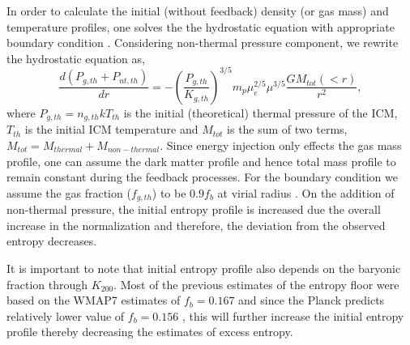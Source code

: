\documentclass[a4paper,fleqn,usenatbib]{mnras}
\begin{document}
In order to calculate the initial (without feedback) density (or gas mass) and temperature profiles, one solves the the hydrostatic equation with appropriate boundary condition \citep{Chaudhuri2012,Chaudhuri2013}. 
Considering non-thermal pressure component, we rewrite the hydrostatic equation as,
\begin{equation}
\frac{d(P_{g,th}+P_{nt,th})}{dr} =-\left( \frac{P_{g,th}}{K_{g,th}} \right )^{3/5}  m_p \mu_e^{2/5} \mu^{3/5}  \frac{ G M_{tot}( <r ) }{ r^2} ,
\label{H:he2}
\end{equation}
where $P_{g,th} = n_{g,th}kT_{th}$ is the initial (theoretical) thermal pressure of the ICM, $T_{th}$ is the initial ICM temperature and $M_{tot}$ is the sum of two terms, $M_{tot}=M_{thermal}+M_{non-thermal}$. 
Since energy injection only effects the gas mass profile, one can assume the dark matter profile and hence total mass profile to remain constant during the feedback processes.
For the boundary condition  we assume the gas fraction ($f_{g,th}$) to be $0.9f_b$ at virial radius \citep{Crain2007}.
On the addition of non-thermal pressure, the initial entropy profile is increased due the overall increase in the normalization and therefore, the  deviation from the observed entropy decreases. 

It is important to note that initial entropy profile also depends on the baryonic fraction through $K_{200}$. Most of the previous estimates of the entropy floor were based on the 
WMAP7 estimates of $f_b=0.167$ and since the Planck predicts relatively lower value of $f_b=0.156$ \citep{Planck2013b,Planck2015}, this will further increase the initial entropy profile thereby decreasing the estimates of excess entropy. 
\end{document}
